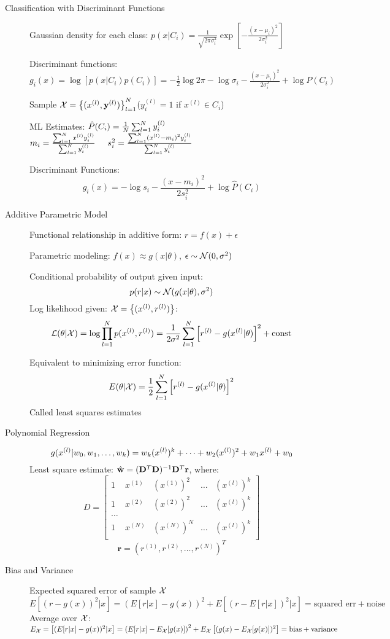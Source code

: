\begin{description}
\item[Classification with Discriminant Functions] 
    Gaussian density for each class: $p(x|C_i) = \frac{1}{\sqrt{2\pi
    \sigma^2_i}} \exp\left[ -\frac{(x-\mu_i)^2}{2\sigma_i^2} \right] $

    Discriminant functions:
    $g_i(x) = \log\left[ p(x|C_i)p(C_i) \right] = -\frac{1}{2}\log 2\pi -
    \log\sigma_i -\frac{(x-\mu_i)^2}{2\sigma^2_i} +\log P(C_i)$

    Sample $\mathcal{X} = \left\{ (x^{(l)}, \mathbf{y}^{(l)}) \right\}^N_{l=1}$($y_i^{(l)} = 1$ if
    $x^{(l)}\in C_i$)

    ML Estimates: $\hat{P}(C_i) = \frac{1}{N}\sum_{l=1}^Ny^{(l)}_i$\\
    $m_i = \frac{\sum_{l=1}^N x^{(l)} y^{(l)}_i}{\sum_{l=1}^Ny^{(l)}_i} \hspace{0.5cm} s_i^2=  \frac{\sum_{l=1}^N
    (x^{(l)} - m_i)^2y^{(l)}_i}{\sum_{l=1}^Ny^{(l)}_i} $

    Discriminant Functions: \[g_i(x) = -\log s_i - \frac{(x-m_i)^2}{2s_i^2} +
    \log \hat{P}(C_i)\]
\item[Additive Parametric Model] Functional relationship in additive form:
    $r = f(x) + \epsilon$

    Parametric modeling: $f(x) \approx g(x|\theta)$, $\epsilon \sim \mathcal{N}(0,
    \sigma^2)$

    Conditional probability of output given input:
    \[p(r|x) \sim \mathcal{N}(g(x|\theta), \sigma^2)\]
    Log likelihood given: $\mathcal{X} = \left\{ (x^{(l)}, r^{(l)}) \right\}$:
    \[
        \mathcal{L}(\theta|\mathcal{X}) = \log \prod_{l=1}^N p(x^{(l)}, r^{(l)}) =
        \frac{1}{2\sigma^2}\sum_{l=1}^N\left[ r^{(l)} - g(x^{(l)}|\theta) \right]^2 +
        \mbox{const}
    \]

    Equivalent to minimizing error function:
    \[
        E(\theta|\mathcal{X}) = \frac{1}{2}\sum_{l=1}^N\left[ r^{(l)} - g(x^{(l)}|\theta) \right]^2
    \]
    Called least squares estimates
\item[Polynomial Regression] 
    \[ g(x^{(l)}|w_0, w_1, \dots, w_k) = w_k(x^{(l)})^k + \dots + w_2(x^{(l)})^2 + w_1x^{(l)}
        + w_0 \]
        Least square estimate: $\hat{\mathbf{w}} = (\mathbf{D}^T\mathbf{D})^{-1}\mathbf{D}^T\mathbf{r}$,
        where:
        \[ D = \begin{bmatrix}
            1 & x^{(1)} & (x^{(1)})^2  & \dots & (x^{(l)})^k \\
            1 & x^{(2)} & (x^{(2)})^2  & \dots & (x^{(l)})^k \\
            \dots\\
            1 & x^{(N)} & (x^{(N)})^N  & \dots & (x^{(l)})^k \\
        \end{bmatrix}
    \]
    \[ \mathbf{r} = \left( r^{(1)}, r^{(2)},\dots,r^{(N)} \right)^T \]
\item[Bias and Variance] Expected squared error of sample $\mathcal{X}$
    $E\left[ (r-g(x))^2|x \right] = \left( E\left[ r|x \right] - g(x) \right)^2+E\left[
        (r-E\left[ r|x \right])^2|x \right] = \mbox{squared err}+\mbox{noise}$\\
        Average over $\mathcal{X}$: $E_{\mathcal{X}} = \left[ (E[r|x]-g(x))^2|x\right] = \left(
        E[r|x]-E_{\mathcal{X}}[g(x)]\right)^2 + E_{\mathcal{X}}\left[ (g(x)-E_{\mathcal{X}}[g(x)])^2
    \right] = \mbox{bias}+\mbox{variance}$

\end{description}
